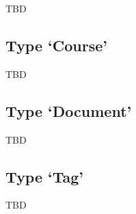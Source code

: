 TBD


\subsection{Type `Course'}

TBD


\subsection{Type `Document'}

TBD


\subsection{Type `Tag'}

TBD


